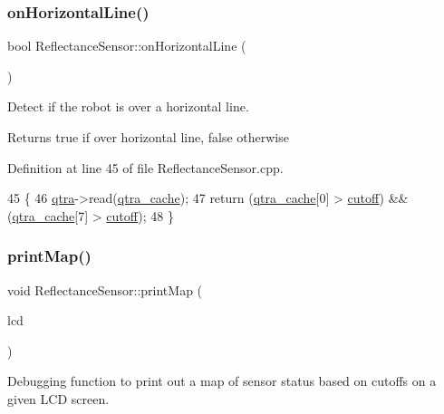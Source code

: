 \subsubsection{\texorpdfstring{on\+Horizontal\+Line()}{onHorizontalLine()}}
{\footnotesize\ttfamily bool Reflectance\+Sensor\+::on\+Horizontal\+Line (\begin{DoxyParamCaption}\item[{void}]{ }\end{DoxyParamCaption})}



Detect if the robot is over a horizontal line. 

\begin{DoxyReturn}{Returns}
true if over horizontal line, false otherwise 
\end{DoxyReturn}


Definition at line 45 of file Reflectance\+Sensor.\+cpp.


\begin{DoxyCode}
45                                              \{
46     \hyperlink{class_reflectance_sensor_a1eb0a090b619705b0234cea224400829}{qtra}->read(\hyperlink{class_reflectance_sensor_ab4b708129419215a57eec3b0af611542}{qtra\_cache});
47     \textcolor{keywordflow}{return} (\hyperlink{class_reflectance_sensor_ab4b708129419215a57eec3b0af611542}{qtra\_cache}[0] > \hyperlink{class_reflectance_sensor_ab690b7c2e5b1ba69c0068841fe916dbd}{cutoff}) && (\hyperlink{class_reflectance_sensor_ab4b708129419215a57eec3b0af611542}{qtra\_cache}[7] > 
      \hyperlink{class_reflectance_sensor_ab690b7c2e5b1ba69c0068841fe916dbd}{cutoff});
48 \}
\end{DoxyCode}
\mbox{\label{class_reflectance_sensor_a065644d5cf3d71d81ea4f91787c2915d}} 
\subsubsection{\texorpdfstring{print\+Map()}{printMap()}}
{\footnotesize\ttfamily void Reflectance\+Sensor\+::print\+Map (\begin{DoxyParamCaption}\item[{Liquid\+Crystal $\ast$}]{lcd }\end{DoxyParamCaption})}



Debugging function to print out a map of sensor status based on cutoffs on a given L\+CD screen. 


